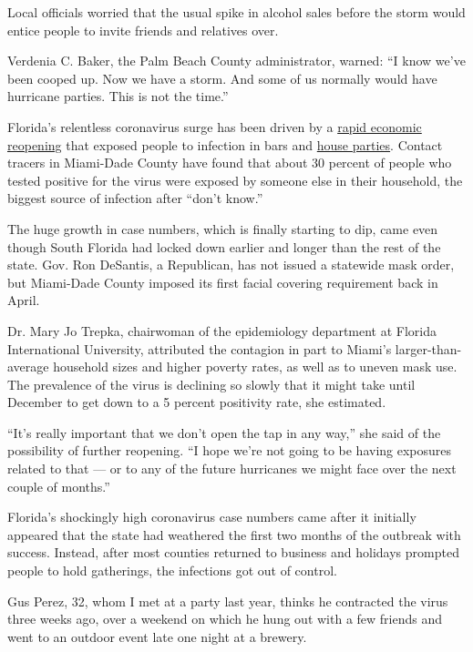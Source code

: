 Local officials worried that the usual spike in alcohol sales before the
storm would entice people to invite friends and relatives over.

Verdenia C. Baker, the Palm Beach County administrator, warned: ``I know
we've been cooped up. Now we have a storm. And some of us normally would
have hurricane parties. This is not the time.''

Florida's relentless coronavirus surge has been driven by a
\href{https://www.nytimes.com/2020/06/26/us/coronavirus-florida-texas-bars-closing.html}{rapid
economic reopening} that exposed people to infection in bars and
\href{https://www.nytimes.com/2020/07/06/us/coronavirus-florida-miami.html}{house
parties}. Contact tracers in Miami-Dade County have found that about 30
percent of people who tested positive for the virus were exposed by
someone else in their household, the biggest source of infection after
``don't know.''

The huge growth in case numbers, which is finally starting to dip, came
even though South Florida had locked down earlier and longer than the
rest of the state. Gov. Ron DeSantis, a Republican, has not issued a
statewide mask order, but Miami-Dade County imposed its first facial
covering requirement back in April.

Dr. Mary Jo Trepka, chairwoman of the epidemiology department at Florida
International University, attributed the contagion in part to Miami's
larger-than-average household sizes and higher poverty rates, as well as
to uneven mask use. The prevalence of the virus is declining so slowly
that it might take until December to get down to a 5 percent positivity
rate, she estimated.

``It's really important that we don't open the tap in any way,'' she
said of the possibility of further reopening. ``I hope we're not going
to be having exposures related to that --- or to any of the future
hurricanes we might face over the next couple of months.''

Florida's shockingly high coronavirus case numbers came after it
initially appeared that the state had weathered the first two months of
the outbreak with success. Instead, after most counties returned to
business and holidays prompted people to hold gatherings, the infections
got out of control.

Gus Perez, 32, whom I met at a party last year, thinks he contracted the
virus three weeks ago, over a weekend on which he hung out with a few
friends and went to an outdoor event late one night at a brewery.

